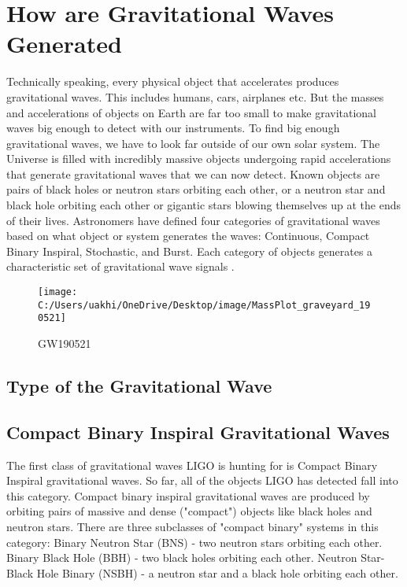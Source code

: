 \section{How are Gravitational Waves Generated}
Technically speaking, every physical object that accelerates produces gravitational waves. This includes humans, cars, airplanes etc. But the masses and accelerations of objects on Earth are far too small to make gravitational waves big enough to detect with our instruments. To find big enough gravitational waves, we have to look far outside of our own solar system.
The Universe is filled with incredibly massive objects undergoing rapid accelerations that generate gravitational waves that we can now detect. Known objects are  pairs of black holes or neutron stars orbiting each other, or a neutron star and black hole orbiting each other or gigantic stars blowing themselves up at the ends of their lives. Astronomers have defined four categories of gravitational waves based on what object or system generates the waves: Continuous, Compact Binary Inspiral, Stochastic, and Burst. Each category of objects generates a characteristic set of gravitational wave signals .



\begin{figure}
	\centering
	\texttt{[image: C:/Users/uakhi/OneDrive/Desktop/image/MassPlot\_graveyard\_190521]}
	\caption{GW190521}
	\label{fig:massplotgraveyard190521}
\end{figure}


\subsection*{Type of the Gravitational Wave }

\subsection{Compact Binary Inspiral Gravitational Waves}
The first class of gravitational waves LIGO is hunting for is Compact Binary Inspiral gravitational waves. So far, all of the objects LIGO has detected fall into this category. Compact binary inspiral gravitational waves are produced by orbiting pairs of massive and dense ("compact") objects like black holes and neutron stars. There are three subclasses of "compact binary" systems in this category:
Binary Neutron Star (BNS) - two neutron stars orbiting each other.
Binary Black Hole (BBH) - two black holes orbiting each other.
Neutron Star-Black Hole Binary (NSBH) - a neutron star and a black hole orbiting each other.




